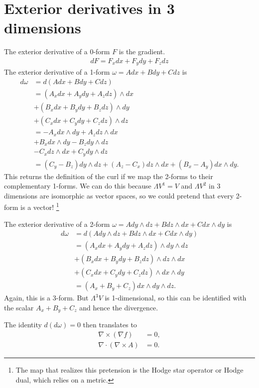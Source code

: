\documentclass[aps,nofootinbib]{revtex4}
\begin{document}
\appendix

\section{Exterior derivatives in 3 dimensions}\label{appendix}

The exterior derivative of a 0-form $F$ is the gradient.
\begin{align}
dF = F_x dx + F_y dy + F_z dz 
\end{align}
The exterior derivative of a 1-form $\omega = A dx + B dy + C dz$ is
\begin{align*}
d\omega &= d (A dx + B dy + C dz) \\
	&= (A_x dx + A_y dy + A_z dz) \wedge dx \\
    & + (B_x dx + B_y dy + B_z dz) \wedge dy \\
    & + (C_x dx + C_y dy + C_z dz) \wedge dz \\
    &= - A_x dx \wedge dy + A_z dz \wedge dx \\
    & + B_x dx \wedge dy - B_z dy \wedge dz \\
    & - C_x dz \wedge dx + C_y dy \wedge dz \\ 
    &= (C_y-B_z) dy \wedge dz + (A_z - C_x) dz \wedge dx + (B_x - A_y) dx \wedge dy.
\end{align*}
This returns the definition of the curl if we map the 2-forms to their complementary 1-forms. We can do this because $\Lambda V^1 = V$ and $\Lambda V^2$ in 3 dimensions are isomorphic as vector spaces, so we could pretend that every 2-form is a vector! \footnote{The map that realizes this pretension is the Hodge star operator or Hodge dual, which relies on a metric.}

The exterior derivative of a 2-form $\omega = A dy \wedge dz + B dz \wedge dx + C dx \wedge dy$ is
\begin{align*}
d\omega &= d(A dy \wedge dz + B dz \wedge dx + C dx \wedge dy) \\
	&= (A_x dx + A_y dy + A_z dz) \wedge dy \wedge dz \\
    &+ (B_x dx + B_y dy + B_z dz) \wedge dz \wedge dx \\
    &+ (C_x dx + C_y dy + C_z dz) \wedge dx \wedge dy \\
    &= (A_x + B_y + C_z) dx \wedge dy \wedge dz.
\end{align*}
Again, this is a 3-form. But $\Lambda^3 V$ is 1-dimensional, so this can be identified with the scalar $A_x + B_y + C_z$ and hence the divergence.

The identity $d(d\omega) = 0$ then translates to
\begin{align*}
\nabla \times (\nabla f) &= 0, \\
\nabla \cdot (\nabla \times A) &= 0.
\end{align*}
\end{document}
